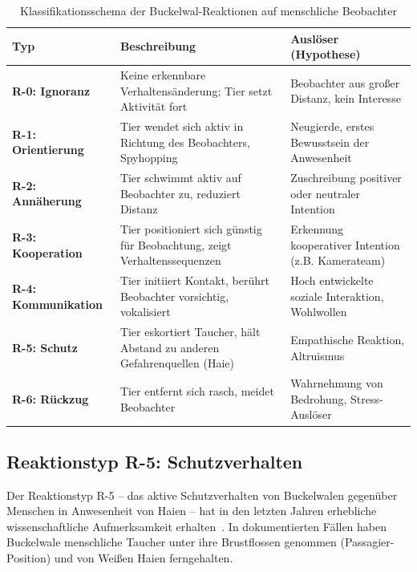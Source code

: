 ﻿\documentclass[12pt,a4paper]{article}
\theoremstyle{definition}
\theoremstyle{remark}
\begin{document}
\begin{table}[h]
  \centering
  \caption{Klassifikationsschema der Buckelwal-Reaktionen auf menschliche Beobachter}
  \label{tab:reaktionen}
  \begin{tabularx}{\textwidth}{p{2.5cm}Xp{3.5cm}}
    \toprule
    \textbf{Typ} & \textbf{Beschreibung} & \textbf{Auslöser (Hypothese)} \\
    \midrule
    \textbf{R-0: Ignoranz} & Keine erkennbare Verhaltensänderung; Tier setzt
    Aktivität fort & Beobachter aus großer Distanz, kein Interesse \\[4pt]
    \textbf{R-1: Orientierung} & Tier wendet sich aktiv in Richtung des
    Beobachters, Spyhopping & Neugierde, erstes Bewusstsein der Anwesenheit \\[4pt]
    \textbf{R-2: Annäherung} & Tier schwimmt aktiv auf Beobachter zu,
    reduziert Distanz & Zuschreibung positiver oder neutraler Intention \\[4pt]
    \textbf{R-3: Kooperation} & Tier positioniert sich günstig für Beobachtung,
    zeigt Verhaltenssequenzen & Erkennung kooperativer Intention (z.B. Kamerateam) \\[4pt]
    \textbf{R-4: Kommunikation} & Tier initiiert Kontakt, berührt Beobachter
    vorsichtig, vokalisiert & Hoch entwickelte soziale Interaktion, Wohlwollen \\[4pt]
    \textbf{R-5: Schutz} & Tier eskortiert Taucher, hält Abstand zu anderen
    Gefahrenquellen (Haie) & Empathische Reaktion, Altruismus \\[4pt]
    \textbf{R-6: Rückzug} & Tier entfernt sich rasch, meidet Beobachter & Wahrnehmung
    von Bedrohung, Stress-Auslöser \\
    \bottomrule
  \end{tabularx}
\end{table}

\subsection{Reaktionstyp R-5: Schutzverhalten}

Der Reaktionstyp R-5 -- das aktive Schutzverhalten von Buckelwalen gegenüber
Menschen in Anwesenheit von Haien -- hat in den letzten Jahren erhebliche
wissenschaftliche Aufmerksamkeit erhalten~\cite{pitman2017humpback}. In
dokumentierten Fällen haben Buckelwale menschliche Taucher unter ihre
Brustflossen genommen (Passagier-Position) und von Weißen Haien
ferngehalten.
\end{document}
